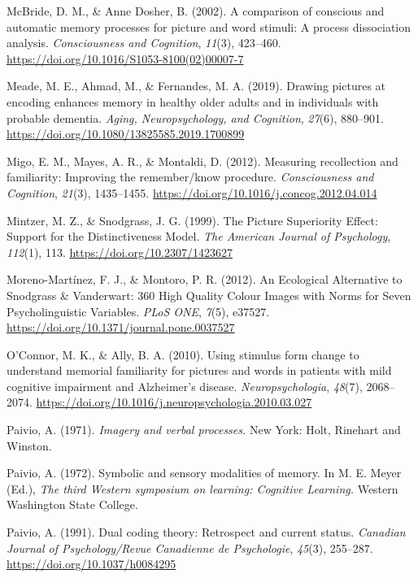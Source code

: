 \documentclass[
  11pt,
]{article}
\begin{document}
\leavevmode\hypertarget{ref-mcbride2002}{}%
McBride, D. M., \& Anne Dosher, B. (2002). A comparison of conscious and
automatic memory processes for picture and word stimuli: A process
dissociation analysis. \emph{Consciousness and Cognition}, \emph{11}(3),
423--460. \url{https://doi.org/10.1016/S1053-8100(02)00007-7}

\leavevmode\hypertarget{ref-meade2019}{}%
Meade, M. E., Ahmad, M., \& Fernandes, M. A. (2019). Drawing pictures at
encoding enhances memory in healthy older adults and in individuals with
probable dementia. \emph{Aging, Neuropsychology, and Cognition},
\emph{27}(6), 880--901.
\url{https://doi.org/10.1080/13825585.2019.1700899}

\leavevmode\hypertarget{ref-migo2012}{}%
Migo, E. M., Mayes, A. R., \& Montaldi, D. (2012). Measuring
recollection and familiarity: Improving the remember/know procedure.
\emph{Consciousness and Cognition}, \emph{21}(3), 1435--1455.
\url{https://doi.org/10.1016/j.concog.2012.04.014}

\leavevmode\hypertarget{ref-mintzer1999}{}%
Mintzer, M. Z., \& Snodgrass, J. G. (1999). The Picture Superiority
Effect: Support for the Distinctiveness Model. \emph{The American
Journal of Psychology}, \emph{112}(1), 113.
\url{https://doi.org/10.2307/1423627}

\leavevmode\hypertarget{ref-moreno-martinez2012}{}%
Moreno-Martínez, F. J., \& Montoro, P. R. (2012). An Ecological
Alternative to Snodgrass \& Vanderwart: 360 High Quality Colour Images
with Norms for Seven Psycholinguistic Variables. \emph{PLoS ONE},
\emph{7}(5), e37527. \url{https://doi.org/10.1371/journal.pone.0037527}

\leavevmode\hypertarget{ref-oconnor2010}{}%
O'Connor, M. K., \& Ally, B. A. (2010). Using stimulus form change to
understand memorial familiarity for pictures and words in patients with
mild cognitive impairment and Alzheimer's disease.
\emph{Neuropsychologia}, \emph{48}(7), 2068--2074.
\url{https://doi.org/10.1016/j.neuropsychologia.2010.03.027}

\leavevmode\hypertarget{ref-paivio1971}{}%
Paivio, A. (1971). \emph{Imagery and verbal processes.} New York: Holt,
Rinehart and Winston.

\leavevmode\hypertarget{ref-paivio1972}{}%
Paivio, A. (1972). Symbolic and sensory modalities of memory. In M. E.
Meyer (Ed.), \emph{The third Western symposium on learning: Cognitive
Learning.} Western Washington State College.

\leavevmode\hypertarget{ref-paivio1991}{}%
Paivio, A. (1991). Dual coding theory: Retrospect and current status.
\emph{Canadian Journal of Psychology/Revue Canadienne de Psychologie},
\emph{45}(3), 255--287. \url{https://doi.org/10.1037/h0084295}
\end{document}
